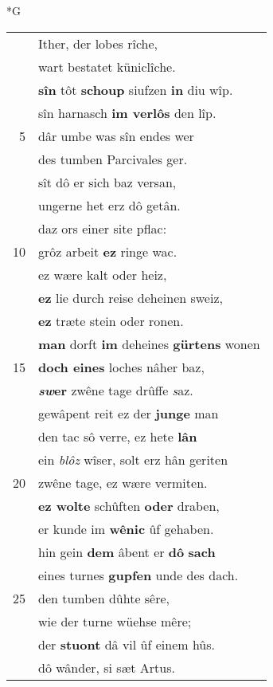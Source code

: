 \documentclass[8pt,a4paper,notitlepage]{article}
\begin{document}
\newpage
\begin{table}[ht]
\begin{minipage}[t]{0.5\linewidth}
\small
\begin{center}*G
\end{center}
\begin{tabular}{rl}
 & Ither, der lobes rîche,\\ 
 & wart bestatet küniclîche.\\ 
 & \textbf{sîn} tôt \textbf{schoup} siufzen \textbf{in} diu wîp.\\ 
 & sîn harnasch \textbf{im verlôs} den lîp.\\ 
5 & dâr umbe was sîn endes wer\\ 
 & des tumben Parcivales ger.\\ 
 & sît dô er sich baz versan,\\ 
 & ungerne het erz dô getân.\\ 
 & daz ors einer site pflac:\\ 
10 & grôz arbeit \textbf{ez} ringe wac.\\ 
 & ez wære kalt oder heiz,\\ 
 & \textbf{ez} lie durch reise deheinen sweiz,\\ 
 & \textbf{ez} træte stein oder ronen.\\ 
 & \textbf{man} dorft \textbf{im} deheines \textbf{gürtens} wonen\\ 
15 & \textbf{doch eines} loches nâher baz,\\ 
 & \textbf{\textit{sw}er} zwêne tage drûffe \textit{s}az.\\ 
 & gewâpent reit ez der \textbf{junge} man\\ 
 & den tac sô verre, ez hete \textbf{lân}\\ 
 & ein \textit{blôz} wîser, solt erz hân geriten\\ 
20 & zwêne tage, ez wære vermiten.\\ 
 & \textbf{ez wolte} schûften \textbf{oder} draben,\\ 
 & er kunde im \textbf{wênic} ûf gehaben.\\ 
 & hin gein \textbf{dem} âbent er \textbf{dô} \textbf{sach}\\ 
 & eines turnes \textbf{gupfen} unde des dach.\\ 
25 & den tumben dûhte sêre,\\ 
 & wie der turne wüehse mêre;\\ 
 & der \textbf{stuont} dâ vil ûf einem hûs.\\ 
 & dô wânder, si sæt Artus.\\ 

\end{tabular}
\end{minipage}
\end{table}
\end{document}
